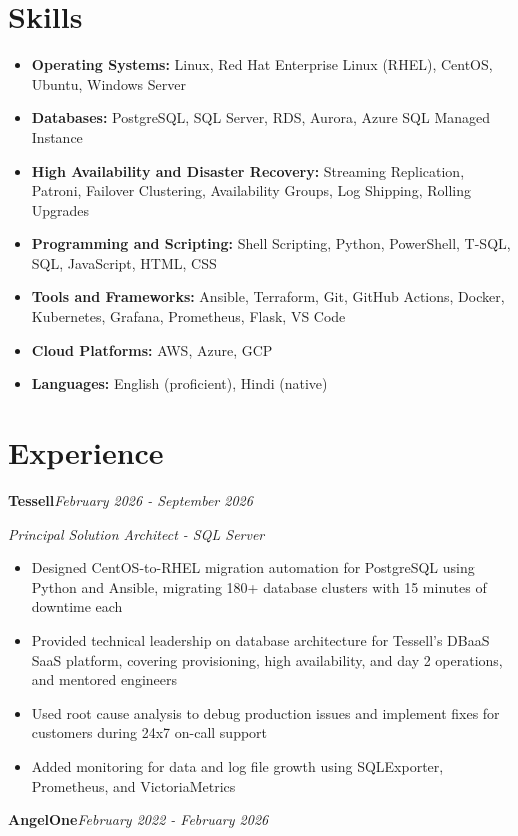 \documentclass[10pt,a4paper]{article}
\begin{document}
\section{Skills}
\begin{itemize}
  \item \textbf{Operating Systems:} Linux, Red Hat Enterprise Linux (RHEL), CentOS, Ubuntu, Windows Server
  \item \textbf{Databases:} PostgreSQL, SQL Server, RDS, Aurora, Azure SQL Managed Instance
  \item \textbf{High Availability and Disaster Recovery:} Streaming Replication, Patroni, Failover Clustering, Availability Groups, Log Shipping, Rolling Upgrades
  \item \textbf{Programming and Scripting:} Shell Scripting, Python, PowerShell, T-SQL, SQL, JavaScript, HTML, CSS
  \item \textbf{Tools and Frameworks:} Ansible, Terraform, Git, GitHub Actions, Docker, Kubernetes, Grafana, Prometheus, Flask, VS Code
  \item \textbf{Cloud Platforms:} AWS, Azure, GCP
  \item \textbf{Languages:} English (proficient), Hindi (native)
\end{itemize}

\section{Experience}

\noindent\textbf{Tessell}\hfill \textit{February 2026 - September 2026}

\textit{Principal Solution Architect - SQL Server}\\[-5pt]
\begin{itemize}
  \item Designed CentOS-to-RHEL migration automation for PostgreSQL using Python and Ansible, migrating 180+ database clusters with 15 minutes of downtime each
  \item Provided technical leadership on database architecture for Tessell's DBaaS SaaS platform, covering provisioning, high availability, and day 2 operations, and mentored engineers
  \item Used root cause analysis to debug production issues and implement fixes for customers during 24x7 on-call support
  \item Added monitoring for data and log file growth using SQLExporter, Prometheus, and VictoriaMetrics
\end{itemize}
\vspace{14.7pt}
\noindent\textbf{AngelOne}\hfill \textit{February 2022 - February 2026}
\end{document}
